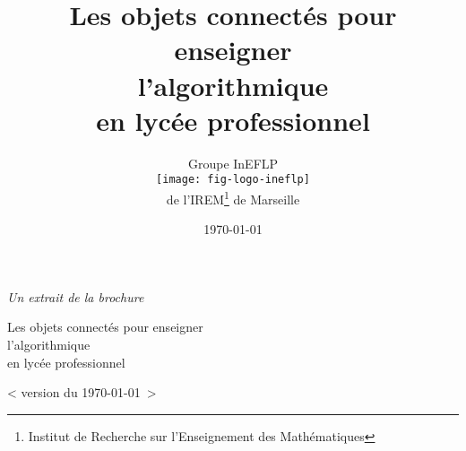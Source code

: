 \documentclass[10pt]{article}
\title{%
    Les objets connectés pour enseigner\\
    l'algorithmique\\
    en lycée professionnel}
\author{%
    Groupe InEFLP\\
    \texttt{[image: fig-logo-ineflp]}\\
    de l'IREM\footnote{Institut de Recherche sur l'Enseignement des Mathématiques} de Marseille
    }
\date{\today}
\begin{document}
\newpage\nopagecolor








\newpage




\begin{center}
    {\footnotesize \textit{Un extrait de la brochure}}

    {\Large Les objets connectés pour enseigner\\
    l'algorithmique\\
    en lycée professionnel}



{\small < version du \today~>}

\end{center}
\end{document}
